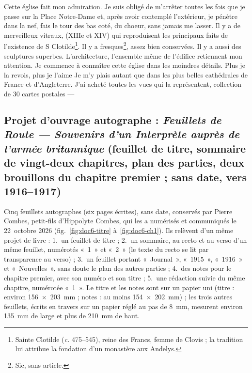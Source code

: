 \begin{LJlettre}
Cette église fait mon admiration. Je suis obligé de m'arrêter toutes les fois que je passe sur la Place Notre-Dame et, après avoir contemplé l'extérieur, je pénètre dans la nef, fais le tour des bas coté, du choeur, sans jamais me lasser. Il y a de merveilleux vitraux, (XIIIe et XIV) qui reproduisent les principaux faits de l'existence de S Clotilde\footnote{Sainte Clotilde (\textit{c.} 475--545), reine des Francs, femme de Clovis ; la tradition lui attribue la fondation d'un monastère aux Andelys.}. Il y a fresques\footnote{Sic, sans article.}, assez bien conservées. Il y a aussi des sculptures superbes. L'architecture, l'ensemble même de l'édifice retiennent mon attention. Je commence à connaître cette église dans les moindres détails. Plus je la revois, plus je l'aime Je m'y plais autant que dans les plus belles cathédrales de France et d'Angleterre. J'ai acheté toutes les vues qui la représentent, collection de 30 cartes postales ---
\end{LJlettre}


\FloatBarrier
\subsection{Projet d'ouvrage autographe : \textit{Feuillets de Route — Souvenirs d'un Interprète auprès de l'armée britannique} (feuillet de titre, sommaire de vingt-deux chapitres, plan des parties, deux brouillons du chapitre premier ; sans date, vers 1916--1917)}
\label{annexe:doc6}
\suppressfloats[t]

Cinq feuillets autographes (six pages écrites), sans date, conservés par Pierre Combes, petit-fils d'Hippolyte Combes, qui les a numérisés et communiqués le 22~octobre 2026 (fig.~\ref{fig:doc6-titre} à~\ref{fig:doc6-ch1}). Ils relèvent d'un même projet de livre : 1.~un feuillet de titre ; 2.~un sommaire, au recto et au verso d'un même feuillet, numérotés «~1~» et «~2~» (le texte du recto se lit par transparence au verso) ; 3.~un feuillet portant «~Journal~», «~1915~», «~1916~» et «~Nouvelles~», sans doute le plan des autres parties ; 4.~des notes pour le chapitre premier, avec son numéro et son titre ; 5.~une rédaction suivie du même chapitre, numérotée «~1~». Le titre et les notes sont sur un papier uni (titre : environ 156~×~203~mm ; notes : au moins 154~×~202~mm) ; les trois autres feuillets, écrits en travers sur un papier réglé au pas de 8~mm, mesurent environ 135~mm de large et plus de 210~mm de haut.

